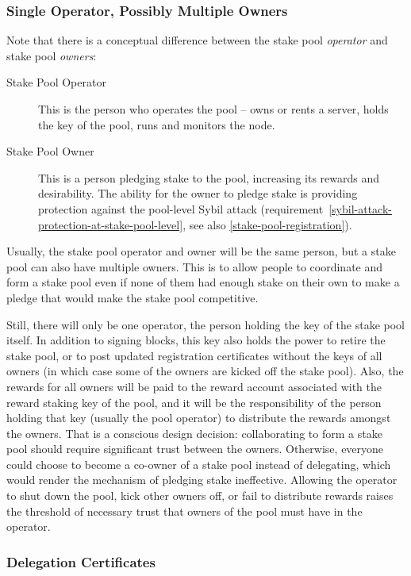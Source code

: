 \documentclass[11pt,a4paper,dvipsnames,twosided]{article}
\begin{document}
\subsubsection{Single Operator, Possibly Multiple Owners}
\label{multiple-owners}

Note that there is a conceptual difference between the stake pool
\emph{operator} and stake pool \emph{owners}:
\begin{description}
\item[Stake Pool Operator] This is the person who operates the pool -- owns or
  rents a server, holds the key of the pool, runs and monitors the
  node.
\item[Stake Pool Owner] This is a person pledging stake
  to the pool, increasing its rewards and desirability. The ability
  for the owner to pledge stake is providing protection against the
  pool-level Sybil attack
  (requirement~\ref{sybil-attack-protection-at-stake-pool-level}, see
  also \cref{stake-pool-registration}).
\end{description}

Usually, the stake pool operator and owner will be the same person,
but a stake pool can also have multiple owners. This is to allow
people to coordinate and form a stake pool even if none of them had
enough stake on their own to make a pledge that would make the stake
pool competitive.

Still, there will only be one operator, the person holding the key of the stake
pool itself. In addition to signing blocks, this key also holds the power to
retire the stake pool, or to post updated registration certificates without the
keys of all owners (in which case some of the owners are kicked off the stake
pool). Also, the rewards for all owners will be paid to the reward account
associated with the reward staking key of the pool, and it will be the
responsibility of the person holding that key (usually the pool operator) to
distribute the rewards amongst the owners.
That is a conscious design decision: collaborating to form a stake pool should
require significant trust between the owners. Otherwise, everyone could choose
to become a co-owner of a stake pool instead of delegating, which would render
the mechanism of pledging stake ineffective. Allowing the operator to shut down
the pool, kick other owners off, or fail to distribute rewards raises the
threshold of necessary trust that owners of the pool must have in the operator.

\subsubsection{Delegation Certificates}
\label{delegation-certificates}
\end{document}
